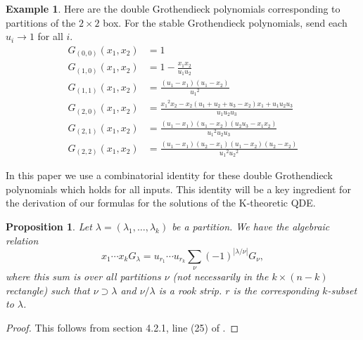 \documentclass[12pt]{article}
\newtheorem{proposition}[theorem]{Proposition}
\theoremstyle{plain}
\theoremstyle{definition}
\newtheorem{example}[theorem]{Example}
\begin{document}
\begin{example}
    Here are the double Grothendieck polynomials corresponding to partitions of the $2\times 2$ box. For the stable Grothendieck polynomials, send each $u_i \to 1$ for all $i$.
    \begin{align*}
        G_{(0,0)} (x_1,x_2)&= 1\\
        G_{(1,0)} (x_1,x_2)&= {1-\frac {x_{{1}}x_{{2}}}{u_{{1}}u_{{2}}}}\\
        G_{(1,1)} (x_1,x_2)&= {\frac { \left( u_{{1}}-x_{{1}} \right)  \left( u_{{1}}-x_{{2}}
 \right) }{{u_{{1}}}^{2}}}
\\
        G_{(2,0)}(x_1,x_2) &= {\frac {{x_{{1}}}^{2}x_{{2}}-x_{{2}} \left( u_{{1}}+u_{{2}}+u_{{3}}-x_
{{2}} \right) x_{{1}}+u_{{1}}u_{{2}}u_{{3}}}{u_{{1}}u_{{2}}u_{{3}}}}
\\
        G_{(2,1)} (x_1,x_2)&= {\frac { \left( u_{{1}}-x_{{1}} \right)  \left( u_{{1}}-x_{{2}}
 \right)  \left( u_{{2}}u_{{3}}-x_{{1}}x_{{2}} \right) }{{u_{{1}}}^{2}
u_{{2}}u_{{3}}}}
\\
        G_{(2,2)} (x_1,x_2)&= {\frac { \left( u_{{1}}-x_{{1}} \right)  \left( u_{{2}}-x_{{1}}
 \right)  \left( u_{{1}}-x_{{2}} \right)  \left( u_{{2}}-x_{{2}}
 \right) }{{u_{{1}}}^{2}{u_{{2}}}^{2}}}
    \end{align*}
\end{example}

In this paper we use a combinatorial identity for these double Grothendieck polynomials which holds for all inputs. This identity will be a key ingredient for the derivation of our formulas for the solutions of the K-theoretic QDE.
\begin{proposition}\label{pierigkprop}
Let $\lambda=(\lambda_1,\dots,\lambda_k)$ be a partition. We have the algebraic relation
    \begin{equation}
        x_1\cdots x_k G_\lambda  = u_{r_1}\cdots u_{r_k}\sum \limits_{\nu} (-1)^{|\lambda / \nu|} G_\nu ,
    \end{equation}
    where this sum is over all partitions $\nu$ (not necessarily in the $k\times (n-k)$ rectangle) such that $\nu \supset \lambda$ and $\nu/\lambda$ is a rook strip. $r$ is the corresponding $k$-subset to $\lambda$.
\end{proposition}
\begin{proof}
    This follows from section 4.2.1, line (25) of \cite{wheelerG}.
\end{proof}

\end{document}
